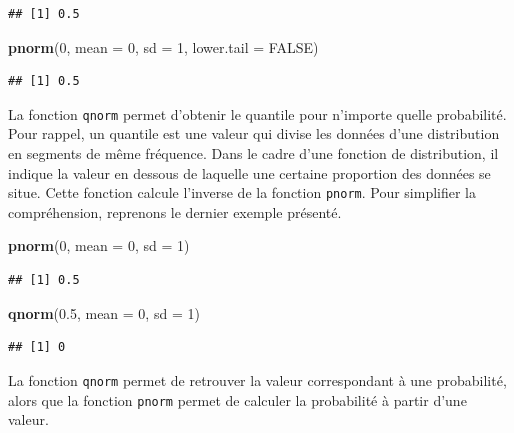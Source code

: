 \documentclass[
]{book}
\newenvironment{Shaded}{\begin{snugshade}}{\end{snugshade}}
\newcommand{\AttributeTok}[1]{\textcolor[rgb]{0.13,0.29,0.53}{#1}}
\newcommand{\ConstantTok}[1]{\textcolor[rgb]{0.56,0.35,0.01}{#1}}
\newcommand{\DecValTok}[1]{\textcolor[rgb]{0.00,0.00,0.81}{#1}}
\newcommand{\FloatTok}[1]{\textcolor[rgb]{0.00,0.00,0.81}{#1}}
\newcommand{\FunctionTok}[1]{\textcolor[rgb]{0.13,0.29,0.53}{\textbf{#1}}}
\newcommand{\NormalTok}[1]{#1}
\begin{document}
\begin{verbatim}
## [1] 0.5
\end{verbatim}

\begin{Shaded}
\begin{Highlighting}[]
\FunctionTok{pnorm}\NormalTok{(}\DecValTok{0}\NormalTok{, }\AttributeTok{mean =} \DecValTok{0}\NormalTok{, }\AttributeTok{sd =} \DecValTok{1}\NormalTok{, }\AttributeTok{lower.tail =} \ConstantTok{FALSE}\NormalTok{)}
\end{Highlighting}
\end{Shaded}

\begin{verbatim}
## [1] 0.5
\end{verbatim}

La fonction \texttt{qnorm} permet d'obtenir le quantile pour n'importe quelle probabilité. Pour rappel, un quantile est une valeur qui divise les données d'une distribution en segments de même fréquence. Dans le cadre d'une fonction de distribution, il indique la valeur en dessous de laquelle une certaine proportion des données se situe. Cette fonction calcule l'inverse de la fonction \texttt{pnorm}. Pour simplifier la compréhension, reprenons le dernier exemple présenté.

\begin{Shaded}
\begin{Highlighting}[]
\FunctionTok{pnorm}\NormalTok{(}\DecValTok{0}\NormalTok{, }\AttributeTok{mean =} \DecValTok{0}\NormalTok{, }\AttributeTok{sd =} \DecValTok{1}\NormalTok{) }
\end{Highlighting}
\end{Shaded}

\begin{verbatim}
## [1] 0.5
\end{verbatim}

\begin{Shaded}
\begin{Highlighting}[]
\FunctionTok{qnorm}\NormalTok{(}\FloatTok{0.5}\NormalTok{, }\AttributeTok{mean =} \DecValTok{0}\NormalTok{, }\AttributeTok{sd =} \DecValTok{1}\NormalTok{)}
\end{Highlighting}
\end{Shaded}

\begin{verbatim}
## [1] 0
\end{verbatim}

La fonction \texttt{qnorm} permet de retrouver la valeur correspondant à une probabilité, alors que la fonction \texttt{pnorm} permet de calculer la probabilité à partir d'une valeur.
\end{document}
